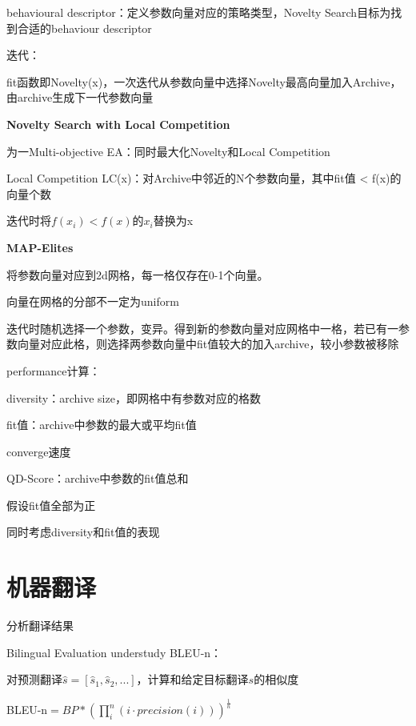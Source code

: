 \documentclass[UTF8]{ctexart}
\begin{document}
  \quad \quad behavioural descriptor：定义参数向量对应的策略类型，Novelty Search目标为找到合适的behaviour descriptor

  \quad 迭代：

  \quad \quad fit函数即Novelty(x)，一次迭代从参数向量中选择Novelty最高向量加入Archive，由archive生成下一代参数向量

  \textbf{Novelty Search with Local Competition}

  \quad 为一Multi-objective EA：同时最大化Novelty和Local Competition

  \quad Local Competition LC(x)：对Archive中邻近的N个参数向量，其中fit值 < f(x)的向量个数

  \quad \quad 迭代时将$f(x_i) < f(x)$的$x_i$替换为x

  \textbf{MAP-Elites}

  \quad 将参数向量对应到2d网格，每一格仅存在0-1个向量。

  \quad \quad 向量在网格的分部不一定为uniform

  \quad 迭代时随机选择一个参数，变异。得到新的参数向量对应网格中一格，若已有一参数向量对应此格，则选择两参数向量中fit值较大的加入archive，较小参数被移除

  \quad performance计算：

  \quad \quad diversity：archive size，即网格中有参数对应的格数

  \quad \quad fit值：archive中参数的最大或平均fit值

  \quad \quad converge速度

  \quad \quad QD-Score：archive中参数的fit值总和

  \quad \quad \quad 假设fit值全部为正

  \quad \quad \quad 同时考虑diversity和fit值的表现

\section{机器翻译}
\noindent 分析翻译结果

  Bilingual Evaluation understudy BLEU-n：

  \quad 对预测翻译$\hat{s} = [\hat{s}_1, \hat{s}_2, ...]$，计算和给定目标翻译$s$的相似度

  \quad BLEU-n$ = BP * (\prod_i^n (i \cdot precision(i)))^{\frac{1}{n}}$
\end{document}
